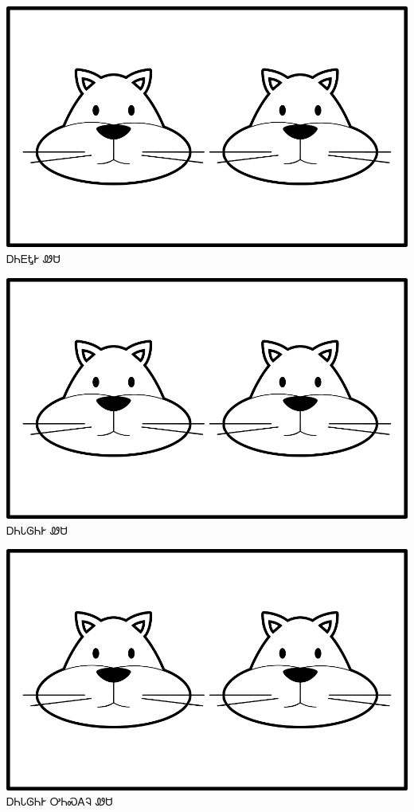 \documentclass[avery5371]{flashcards}%
\begin{document}
    \begin{flashcard}{
        \includegraphics[width=0.95\columnwidth,height=.51\columnwidth,keepaspectratio]{../artwork/for-colors/wesa-anitali}
    }
        \Huge ᎠᏂᎬᎿᎨ ᏪᏌ
    \end{flashcard}

    \begin{flashcard}{
        \includegraphics[width=0.95\columnwidth,height=.51\columnwidth,keepaspectratio]{../artwork/for-colors/wesa-anitali}
    }
        \Huge ᎠᏂᏓᎶᏂᎨ ᏪᏌ
    \end{flashcard}

    \begin{flashcard}{
        \includegraphics[width=0.95\columnwidth,height=.51\columnwidth,keepaspectratio]{../artwork/for-colors/wesa-anitali}
    }
        \Huge ᎠᏂᏓᎶᏂᎨ ᎤᏂᏍᎪᎸ ᏪᏌ
    \end{flashcard}
\end{document}
